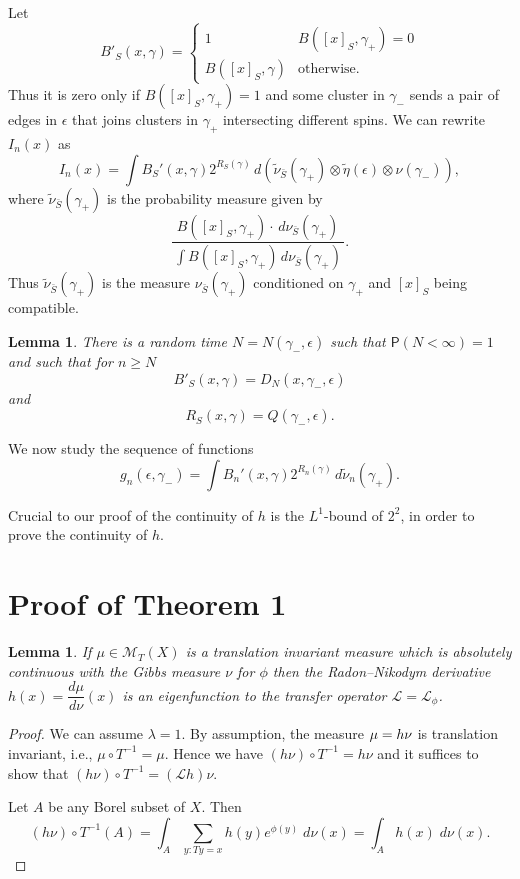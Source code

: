 \documentclass[11pt, a4paper]{amsart}
\newtheorem{lem}[thm]{Lemma}
\theoremstyle{definition}
\theoremstyle{remark}
\renewcommand{\d}{\,d}
\providecommand{\CM}{\mathscr{M}}
\providecommand{\mscr}{\mathscr}
\renewcommand{\P}{\mathsf{P}}
\providecommand{\e}{\epsilon}
\providecommand{\g}{\gamma}
\def\X{X}
\def\T{T}
\begin{document}
Let
$$ B'_S(x,\g) = \begin{cases} 1 & B([x]_S,\g_+) = 0 \\ B([x]_S,\g) & \text{otherwise.} \end{cases} $$
Thus it is zero only if $B([x]_S,\g_+)=1$ and some cluster in $\g_-$ sends a
pair of edges in $\e$ that joins clusters in $\g_+$ intersecting different
spins. We can rewrite $I_n(x)$ as
\begin{equation}
  I_n(x) = \int B_S'(x,\g) 2^{R_S(\g)}\d(\tilde \nu_{\bar S}(\g_+)\otimes\tilde \eta(\e)\otimes\nu(\g_-)),
\end{equation}
where $\tilde\nu_{\bar S}(\g_+)$ is the probability measure given by
\begin{equation}\label{eq:nutilde}
  \frac {B([x]_S,\g_+) \cdot \d\nu_{\bar S}(\g_+)}{\,\int B([x]_S,\g_+) \d\nu_{\bar S}(\g_+)\,}.
\end{equation}
Thus $\tilde\nu_{\bar S}(\g_+)$ is the measure $\nu_{\bar S}(\g_+)$ conditioned on
$\g_+$ and $[x]_S$ being compatible.

\begin{lem}\label{lem:B'}
  There is a random time $N=N(\g_-,\e)$ such that $\P(N<\infty)=1$ and such that for $n\ge N$
  \begin{equation}\label{eq:B'}
    B'_S(x,\g) = D_N(x,\g_-,\e)
  \end{equation}
  and
  \begin{equation}\label{eq:B'}
    R_S(x,\g) = Q(\g_-,\e).
  \end{equation}
\end{lem}


We now study the sequence of functions
$$ g_n(\epsilon, \g_-)=\int B_n'(x,\g) 2^{R_n(\g)}\d\tilde \nu_n(\g_+).$$

Crucial to our proof of the continuity of $h$ is the $L^1$-bound of $2^2$, in
order to prove the continuity of $h$.

\section{Proof of Theorem 1}\noindent

\begin{lem}
  If $\mu\in\CM_\T(\X)$ is a translation invariant measure which is absolutely
  continuous with the Gibbs measure $\nu$ for $\phi$ then the Radon--Nikodym
  derivative $h(x)=\dfrac{d\mu}{d\nu}(x)$ is an eigenfunction to the transfer
  operator $\mscr L =\mscr L_\phi$.
\end{lem}
\begin{proof}
  We can assume $\lambda=1$. By assumption, the measure $\mu= h \nu$ is translation
  invariant, i.e., $\mu\circ T^{-1}=\mu$. Hence we have $(h\nu)\circ T^{-1}=h\nu$ and it
  suffices to show that $(h\nu) \circ T^{-1}=({\mathcal L}h)\nu$.

  Let $A$ be any Borel subset of $\X$. Then
  $$(h\nu)\circ T^{-1} (A)=\int_A \sum_{y: Ty=x} h(y)e^{\phi(y)}\; d\nu(x)=\int_A h(x)\; d\nu(x).$$
\end{proof}
\end{document}
